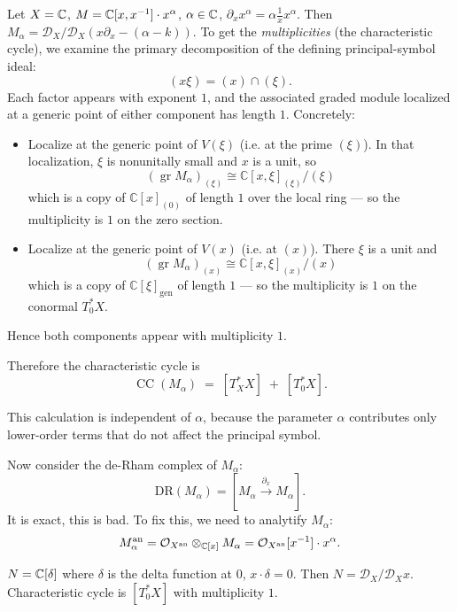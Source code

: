 \begin{examp}
Let $X = \mathbb{C}$, $M = \mathbb{C}[x,x^{-1}] \cdot x^{\alpha}$, $\alpha \in \mathbb{C}$, $\partial_x x^{\alpha} = \alpha \frac{1}{x} x^{\alpha}$. Then $M_{\alpha} = \mathcal{D}_X/\mathcal{D}_X(x\partial_x - (\alpha-k))$. To get the \emph{multiplicities} (the characteristic cycle), we examine the
primary decomposition of the defining principal-symbol ideal:
\[
(x\xi) = (x) \cap (\xi).
\]
Each factor appears with exponent $1$, and the associated graded module localized
at a generic point of either component has length $1$.
Concretely:

\begin{itemize}
  \item Localize at the generic point of $V(\xi)$ (i.e. at the prime $(\xi)$).
  In that localization, $\xi$ is nonunitally small and $x$ is a unit, so
  \[
  (\operatorname{gr} M_\alpha)_{(\xi)} \cong
  \mathbb{C}[x,\xi]_{(\xi)}/(\xi)
  \]
  which is a copy of $\mathbb{C}[x]_{(0)}$ of length $1$ over the local ring —
  so the multiplicity is $1$ on the zero section.

  \item Localize at the generic point of $V(x)$ (i.e. at $(x)$).
  There $\xi$ is a unit and
  \[
  (\operatorname{gr} M_\alpha)_{(x)} \cong
  \mathbb{C}[x,\xi]_{(x)}/(x)
  \]
  which is a copy of $\mathbb{C}[\xi]_{\mathrm{gen}}$ of length $1$ —
  so the multiplicity is $1$ on the conormal $T^*_0 X$.
\end{itemize}

Hence both components appear with multiplicity $1$.

Therefore the characteristic cycle is
\[
\boxed{
  \operatorname{CC}(M_\alpha)
  \;=\;
  [T^*_X X] \;+\; [T^*_0 X].
}
\]

This calculation is independent of $\alpha$, because the parameter $\alpha$
contributes only lower-order terms that do not affect the principal symbol.

\end{examp}

Now consider the de-Rham complex of $M_{\alpha}$:
\[\mathrm{DR}(M_{\alpha}) = [M_{\alpha} \xrightarrow{\partial_x} M_{\alpha}].\]
It is exact, this is bad. To fix this, we need to analytify $M_{\alpha}$:
\[M_{\alpha}^{\mathrm{an}} = \mathcal{O}_{X^{\mathrm{an}}} \otimes_{\mathbb{C}[x]} M_{\alpha} = \mathcal{O}_{X^{\mathrm{an}}}[x^{-1}] \cdot x^{\alpha}.\]


\begin{examp}
  $N = \mathbb{C}[\delta]$ where $\delta$ is the delta function at $0$, $x \cdot \delta = 0$. Then $N = \mathcal{D}_X/\mathcal{D}_X x$. Characteristic cycle is $[T^*_0 X]$ with multiplicity $1$.
\end{examp}

